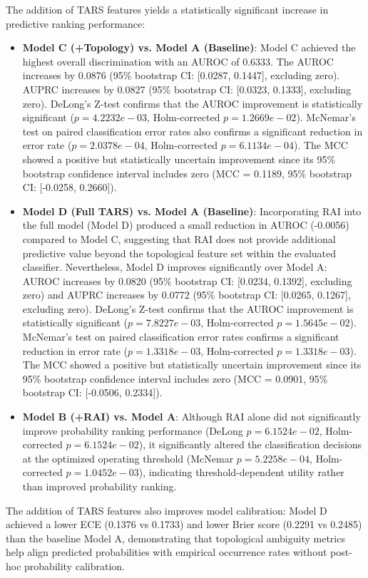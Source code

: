 The addition of TARS features yields a statistically significant increase in predictive ranking performance:
\begin{itemize}
\item \textbf{Model C (+Topology) vs. Model A (Baseline)}: Model C achieved the highest overall discrimination with an AUROC of 0.6333. The AUROC increases by 0.0876 (95\% bootstrap CI: [0.0287, 0.1447], excluding zero). AUPRC increases by 0.0827 (95\% bootstrap CI: [0.0323, 0.1333], excluding zero). DeLong's Z-test confirms that the AUROC improvement is statistically significant ($p = 4.2232e-03$, Holm-corrected $p = 1.2669e-02$). McNemar's test on paired classification error rates also confirms a significant reduction in error rate ($p = 2.0378e-04$, Holm-corrected $p = 6.1134e-04$). The MCC showed a positive but statistically uncertain improvement since its 95\% bootstrap confidence interval includes zero (MCC = 0.1189, 95\% bootstrap CI: [-0.0258, 0.2660]).
\item \textbf{Model D (Full TARS) vs. Model A (Baseline)}: Incorporating RAI into the full model (Model D) produced a small reduction in AUROC (-0.0056) compared to Model C, suggesting that RAI does not provide additional predictive value beyond the topological feature set within the evaluated classifier. Nevertheless, Model D improves significantly over Model A: AUROC increases by 0.0820 (95\% bootstrap CI: [0.0234, 0.1392], excluding zero) and AUPRC increases by 0.0772 (95\% bootstrap CI: [0.0265, 0.1267], excluding zero). DeLong's Z-test confirms that the AUROC improvement is statistically significant ($p = 7.8227e-03$, Holm-corrected $p = 1.5645e-02$). McNemar's test on paired classification error rates confirms a significant reduction in error rate ($p = 1.3318e-03$, Holm-corrected $p = 1.3318e-03$). The MCC showed a positive but statistically uncertain improvement since its 95\% bootstrap confidence interval includes zero (MCC = 0.0901, 95\% bootstrap CI: [-0.0506, 0.2334]).
\item \textbf{Model B (+RAI) vs. Model A}: Although RAI alone did not significantly improve probability ranking performance (DeLong $p = 6.1524e-02$, Holm-corrected $p = 6.1524e-02$), it significantly altered the classification decisions at the optimized operating threshold (McNemar $p = 5.2258e-04$, Holm-corrected $p = 1.0452e-03$), indicating threshold-dependent utility rather than improved probability ranking.
\end{itemize}

The addition of TARS features also improves model calibration: Model D achieved a lower ECE (0.1376 vs 0.1733) and lower Brier score (0.2291 vs 0.2485) than the baseline Model A, demonstrating that topological ambiguity metrics help align predicted probabilities with empirical occurrence rates without post-hoc probability calibration.

